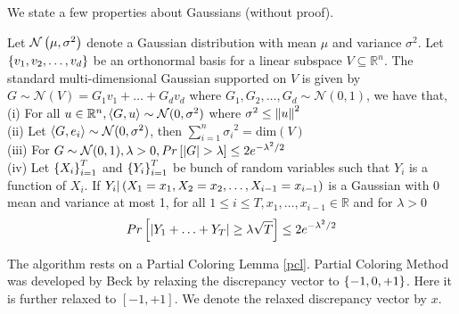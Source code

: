 We state a few properties about Gaussians (without proof).
\begin{Claim} \label{gaussian_properties}
Let $\mathcal{N}\left(\mu,{\sigma}^2 \right )$ denote a Gaussian distribution with mean $\mu$ and variance ${\sigma}^2$. Let $\left\{v_1,v_2,\hdots,v_d\right\}$ be an orthonormal basis for a linear subspace $V \subseteq \mathbb{R}^n$. 
The standard multi-dimensional Gaussian supported on $V$ is given by $G \sim \mathcal{N}(V) = G_1v_1 + \hdots + G_dv_d$ where $G_1,G_2,\hdots,G_d \sim \mathcal{N}(0,1)$, we have that,\\
(i) For all $u \in \mathbb{R}^n, \left\langle G,u\right\rangle \sim \mathcal{N}(0,{\sigma}^2)$ where ${\sigma}^2 \leq \left\lVert u \right\rVert^2$\\
(ii) Let $\left\langle G,e_i\right\rangle \sim \mathcal{N}(0,{\sigma}^2)$, then $\sum_{i=1}^{n}{\sigma_i}^2 = \text{dim}(V)$\\
(iii) For $G \sim \mathcal{N}(0,1), \lambda >0, Pr\left[\left\lvert G \right\rvert>\lambda\right] \leq 2e^{-{\lambda}^2/2} $\\
(iv) Let $\left\{X_i\right\}_{i=1}^{T}$ and $\left\{Y_i\right\}_{i=1}^{T}$ be bunch of random variables such that $Y_i$ is a function of $X_i$. If $Y_i|\left(X_1 = x_1,X_2=x_2,\hdots,X_{i-1}=x_{i-1} \right )$ is a Gaussian with 0 mean and variance at most 1, for all $1 \leq i \leq T,x_1,\hdots,x_{i-1}\in \mathbb{R}$ and for $\lambda > 0$
\[ Pr\left[\left\lvert Y_1 + \hdots + Y_T \right\rvert \geq \lambda\sqrt{T}\right] \leq 2e^{-{\lambda}^2/2} \]
\end{Claim}

The algorithm rests on a Partial Coloring Lemma \ref{pcl}. Partial Coloring Method was developed by Beck \cite{Beck1981} by relaxing the discrepancy vector to $\left\{-1,0,+1\right\}$. Here it is further relaxed to $\left[-1,+1\right]$. 
We denote the relaxed discrepancy vector by $x$.

